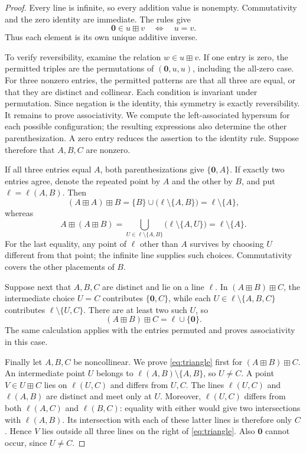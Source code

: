 \documentclass[11pt]{article}
\theoremstyle{remark}
\newcommand{\hz}{\mathbf 0}
\newcommand{\hs}{\boxplus}
\begin{document}
\begin{proof}
Every line is infinite, so every addition value is nonempty.
Commutativity and the zero identity are immediate. The rules give
\begin{equation}\label{eq:self-inverse}
 \hz\in u\hs v\quad\Longleftrightarrow\quad u=v.
\end{equation}
Thus each element is its own unique additive inverse.

To verify reversibility, examine the relation $w\in u\hs v$.
If one entry is zero, the permitted triples are the permutations of
$(\hz,u,u)$, including the all-zero case. For three nonzero entries,
the permitted patterns are that all three are equal, or that they are
distinct and collinear. Each condition is invariant under permutation.
Since negation is the identity, this symmetry is exactly reversibility.
It remains to prove associativity. We compute the left-associated
hypersum for each possible configuration; the resulting expressions
also determine the other parenthesization.
A zero entry reduces the assertion to the identity rule. Suppose
therefore that $A,B,C$ are nonzero.

If all three entries equal $A$, both parenthesizations give
$\{\hz,A\}$. If exactly two entries agree, denote the repeated point
by $A$ and the other by $B$, and put $\ell=\ell(A,B)$. Then
\[
 (A\hs A)\hs B
 =\{B\}\cup\bigl(\ell\setminus\{A,B\}\bigr)
 =\ell\setminus\{A\},
\]
whereas
\[
 A\hs(A\hs B)
 =\bigcup_{U\in\ell\setminus\{A,B\}}
       \bigl(\ell\setminus\{A,U\}\bigr)
 =\ell\setminus\{A\}.
\]
For the last equality, any point of $\ell$ other than $A$ survives by
choosing $U$ different from that point; the infinite line supplies such
choices. Commutativity covers the other placements of $B$.

Suppose next that $A,B,C$ are distinct and lie on a line $\ell$.
In $(A\hs B)\hs C$, the intermediate choice $U=C$ contributes
$\{\hz,C\}$, while each $U\in\ell\setminus\{A,B,C\}$ contributes
$\ell\setminus\{U,C\}$. There are at least two such $U$, so
\[
 (A\hs B)\hs C=\ell\cup\{\hz\}.
\]
The same calculation applies with the entries permuted and proves
associativity in this case.

Finally let $A,B,C$ be noncollinear. We prove
\eqref{eq:triangle} first for $(A\hs B)\hs C$.
An intermediate point $U$ belongs to
$\ell(A,B)\setminus\{A,B\}$, so $U\ne C$. A point
$V\in U\hs C$ lies on $\ell(U,C)$ and differs from $U,C$.
The lines $\ell(U,C)$ and $\ell(A,B)$ are distinct and meet only at
$U$. Moreover, $\ell(U,C)$ differs from both $\ell(A,C)$ and
$\ell(B,C)$: equality with either would give two intersections with
$\ell(A,B)$. Its intersection with each of these latter lines is
therefore only $C$. Hence $V$ lies outside all three lines on the
right of \eqref{eq:triangle}. Also $\hz$ cannot occur, since $U\ne C$.


\end{proof}
\end{document}

